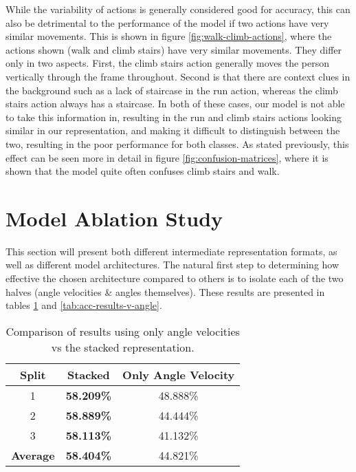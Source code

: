While the variability of actions is generally considered good for accuracy, this can also be detrimental to the performance of the model if two actions have very similar movements. This is shown in figure \ref{fig:walk-climb-actions}, where the actions shown (walk and climb stairs) have very similar movements. They differ only in two aspects. First, the climb stairs action generally moves the person vertically through the frame throughout. Second is that there are context clues in the background such as a lack of staircase in the run action, whereas the climb stairs action always has a staircase. In both of these cases, our model is not able to take this information in, resulting in the run and climb stairs actions looking similar in our representation, and making it difficult to distinguish between the two, resulting in the poor performance for both classes. As stated previously, this effect can be seen more in detail in figure \ref{fig:confusion-matrices}, where it is shown that the model quite often confuses climb stairs and walk.

\section{Model Ablation Study}

This section will present both different intermediate representation formats, as well as different model architectures. The natural first step to determining how effective the chosen architecture compared to others is to isolate each of the two halves (angle velocities \& angles themselves). These results are presented in tables \ref{tab:acc-results-v-velocity} and \ref{tab:acc-results-v-angle}.

\begin{table}[ht]
	\centering
	\begin{tabular}{||c c c||} 
		\hline
		\textbf{Split} & \textbf{Stacked} & \textbf{Only Angle Velocity} \\ [0.5ex] 
		\hline\hline
		1 & \textbf{58.209\%} & 48.888\% \\ 
		\hline
		2 & \textbf{58.889\%} & 44.444\% \\
		\hline
		3 & \textbf{58.113\%} & 41.132\% \\
		\hline
		\hline
		\textbf{Average} & \textbf{58.404\%} & 44.821\% \\
		\hline
	\end{tabular}
	\caption{Comparison of results using only angle velocities vs the stacked representation.}
	\label{tab:acc-results-v-velocity}
\end{table}

